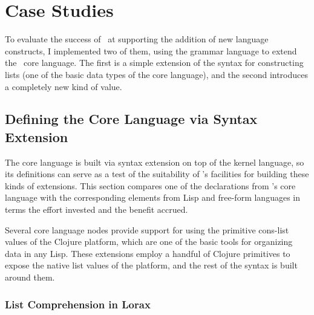 \chapter{Case Studies}
\label{studies}

To evaluate the success of \Meta\ at supporting the addition of new language constructs, I implemented two of them, using the grammar language to extend the \Meta\ core language. The first is a simple extension of the syntax for constructing lists (one of the basic data types of the core language), and the second introduces a completely new kind of value.

%
%
\section{Defining the Core Language via Syntax Extension}
\label{for}
The core language is built via syntax extension on top of the kernel language, so its definitions can serve as a test of the suitability of \Meta's  facilities for building these kinds of extensions. This section compares one of the declarations from \Meta's core language with the corresponding elements from Lisp and free-form languages in terms the effort invested and the benefit accrued.

Several core language nodes provide support for using the primitive cons-list values of the Clojure platform, which are one of the basic tools for organizing data in any Lisp. These extensions employ a handful of Clojure primitives to expose the native list values of the platform, and the rest of the syntax is built around them.


\subsection{List Comprehension in Lorax}

